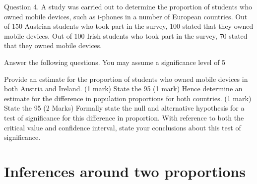 \documentclass[a4paper,12pt]{article}
\begin{document}
Question 4. 
A study was carried out to determine the proportion of students who owned
mobile devices, such as i-phones in a number of European countries.
Out of 150 Austrian students who took part in the survey, 100 stated that they owned mobile devices.
Out of 100 Irish students who took part in the survey, 70 stated that they owned mobile devices.

Answer the following questions. You may assume a significance level of 5%

 Provide an estimate for the proportion of students who owned mobile devices in both Austria and Ireland.
(1 mark) State the 95%
(1 mark) Hence determine an estimate for the difference in population proportions for both countries.
(1 mark) State the 95%
(2  Marks) Formally state the null and alternative hypothesis for a test of significance for this difference in proportion.
 With reference to both the critical value and confidence interval, state your conclusions about this test of significance.  

\section{Inferences around two proportions}
\end{document}
